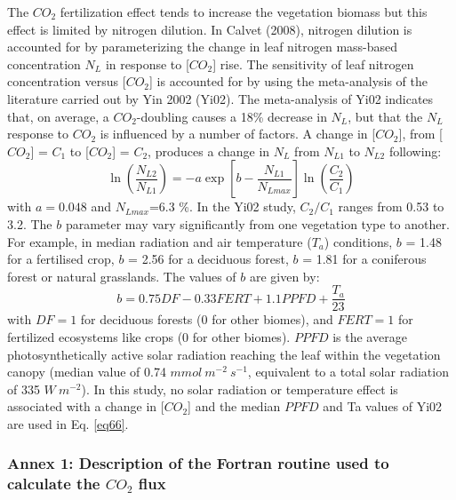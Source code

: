 {The $CO_{2}$ fertilization effect tends to increase the vegetation biomass but this effect is limited by
nitrogen dilution. In Calvet \etal (2008), nitrogen dilution is accounted for by parameterizing the change
in leaf nitrogen mass-based concentration $N_{L}$ in response to [$CO_{2}$] rise. The sensitivity of leaf nitrogen
concentration versus [$CO_{2}$] is accounted for by using the meta-analysis of the literature carried out by
Yin 2002 (Yi02). The meta-analysis of Yi02 indicates that, on average, a $CO_{2}$-doubling causes a 18\%
decrease in $N_{L}$, but that the $N_{L}$ response to $CO_{2}$ is influenced by a number of factors. A change in
[$CO_{2}$], from [$CO_{2}$] = $C_{1}$ to [$CO_{2}$] = $C_{2}$, produces a change in $N_{L}$ from $N_{L1}$ to $N_{L2}$ following:
%
\begin{equation}
\ln \left (  \frac{N_{L2}}{N_{L1}}     \right ) = -a \exp \left [
  b-\frac{N_{L1}}{N_{Lmax}}    \right ] \ln \left (
  \frac{C_{2}}{C_{1}}    \right )
%
\end{equation}
%
with $a=0.048$ and $N_{Lmax}$=6.3 \%. In the Yi02 study, $C_{2}/C_{1}$ ranges from 0.53 to 3.2. The $b$ parameter may
vary significantly from one vegetation type to another. For example, in median radiation and air
temperature ($T_a$) conditions, $b$ = 1.48 for a fertilised crop, $b$ = 2.56 for a deciduous forest, $b$ = 1.81 for
a coniferous forest or natural grasslands.
The values of $b$ are given by:
%
\begin{equation}\label{eq66}
b = 0.75DF-0.33FERT+1.1PPFD+\frac{T_{a}}{23}
\end{equation}
%
with $DF=1$ for deciduous forests (0 for other biomes), and $FERT=1$ for fertilized ecosystems like crops
(0 for other biomes). $PPFD$ is the average photosynthetically active solar radiation reaching the leaf
within the vegetation canopy (median value of 0.74 $mmol ~m^{−2} ~s^{−1}$, equivalent to a total solar radiation
of 335 $W ~m^{−2}$). In this study, no solar radiation or temperature effect is associated with a change in
[$CO_{2}$] and the median $PPFD$ and Ta values of Yi02 are used in Eq. \ref{eq66}.

\subsubsection{Annex 1: Description of the Fortran routine used to calculate the $CO_{2}$ flux}

}
